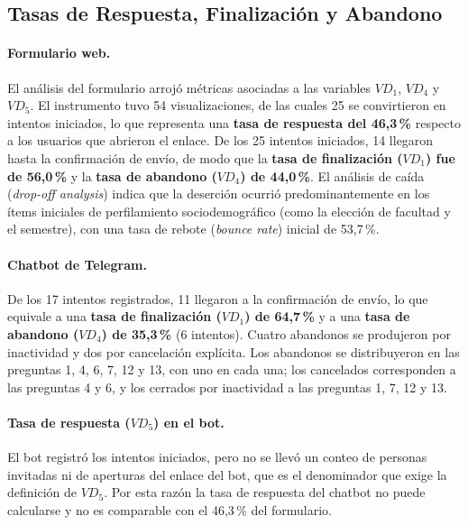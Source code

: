 \documentclass[12pt,letterpaper]{article}
\begin{document}
\subsection{Tasas de Respuesta, Finalización y Abandono}

\paragraph{Formulario web.} El análisis del formulario arrojó métricas asociadas a las variables $VD_1$, $VD_4$ y $VD_5$. El instrumento tuvo 54 visualizaciones, de las cuales 25 se convirtieron en intentos iniciados, lo que representa una \textbf{tasa de respuesta del 46,3\,\%} respecto a los usuarios que abrieron el enlace. De los 25 intentos iniciados, 14 llegaron hasta la confirmación de envío, de modo que la \textbf{tasa de finalización ($VD_1$) fue de 56,0\,\%} y la \textbf{tasa de abandono ($VD_4$) de 44,0\,\%}. El análisis de caída (\textit{drop-off analysis}) indica que la deserción ocurrió predominantemente en los ítems iniciales de perfilamiento sociodemográfico (como la elección de facultad y el semestre), con una tasa de rebote (\textit{bounce rate}) inicial de 53,7\,\%.

\paragraph{Chatbot de Telegram.} De los 17 intentos registrados, 11 llegaron a la confirmación de envío, lo que equivale a una \textbf{tasa de finalización ($VD_1$) de 64,7\,\%} y a una \textbf{tasa de abandono ($VD_4$) de 35,3\,\%} (6 intentos). Cuatro abandonos se produjeron por inactividad y dos por cancelación explícita. Los abandonos se distribuyeron en las preguntas 1, 4, 6, 7, 12 y 13, con uno en cada una; los cancelados corresponden a las preguntas 4 y 6, y los cerrados por inactividad a las preguntas 1, 7, 12 y 13.

\paragraph{Tasa de respuesta ($VD_5$) en el bot.} El bot registró los intentos iniciados, pero no se llevó un conteo de personas invitadas ni de aperturas del enlace del bot, que es el denominador que exige la definición de $VD_5$. Por esta razón la tasa de respuesta del chatbot no puede calcularse y no es comparable con el 46,3\,\% del formulario.
\end{document}
